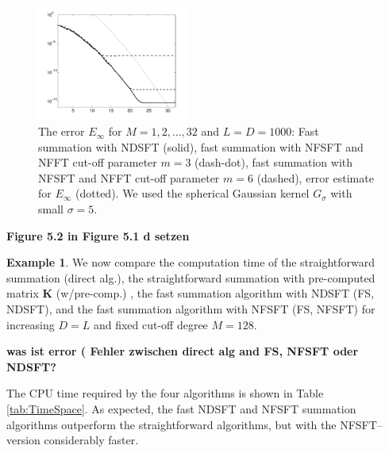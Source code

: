 \documentclass[11pt,a4paper,twoside,bibtotoc]{scrartcl}
\theoremstyle{plain}
\theoremstyle{definition}
\newtheorem{example}[theorem]{Example}
\theoremstyle{remark}
\numberwithin{equation}{section}
\numberwithin{table}{section}
\numberwithin{figure}{section}
\begin{document}
\begin{figure}[tb]
  \centering
  \includegraphics[width=0.45\textwidth]{images/gaussian_test2}
  \caption{The error $E_{\infty}$ for $M = 1,2,\ldots,32$ and $L = D = 1000$: 
  Fast summation with NDSFT (solid), fast summation with NFSFT and 
  NFFT cut-off parameter $m = 3$ (dash-dot), fast summation with NFSFT and NFFT cut-off 
  parameter $m = 6$ (dashed), error estimate for $E_{\infty}$ (dotted). We used the
  spherical Gaussian kernel $G_{\sigma}$ with small $\sigma=5$.}
  \label{fig:gtest2}
\end{figure}

{\bf Figure 5.2 in Figure 5.1 d setzen}

\begin{example}
We now compare the computation time of the straightforward summation
(direct alg.), the 
straightforward summation with pre-computed matrix $\mathbf{K}$
(w/pre-comp.) , the fast summation 
algorithm with NDSFT (FS, NDSFT), and the fast summation algorithm
with NFSFT (FS, NFSFT) for 
increasing $D=L$ and fixed cut-off degree $M=128$. 

{\bf was ist error  ( Fehler zwischen direct alg and FS, NFSFT oder NDSFT?} 

The CPU time required by the four algorithms is shown in Table
\ref{tab:TimeSpace}. 
As expected, the fast NDSFT and NFSFT summation algorithms outperform the 
straightforward algorithms, but with the NFSFT--version considerably
faster. 
\end{example}
\end{document}
